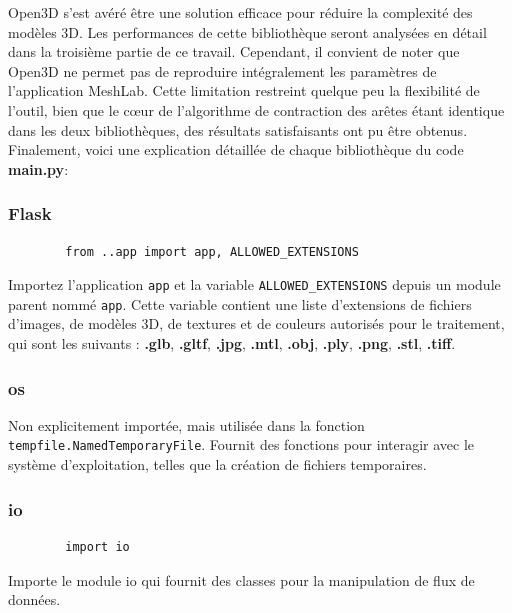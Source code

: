         Open3D s'est avéré être une solution efficace pour réduire la complexité des modèles 3D. Les performances de cette bibliothèque seront analysées en détail dans la troisième partie de ce travail. Cependant, il convient de noter que Open3D ne permet pas de reproduire intégralement les paramètres de l'application MeshLab. Cette limitation restreint quelque peu la flexibilité de l'outil, bien que le cœur de l'algorithme de contraction des arêtes étant identique dans les deux bibliothèques, des résultats satisfaisants ont pu être obtenus. Finalement, voici une explication détaillée de chaque bibliothèque du code \textbf{main.py}:

        \subsubsection{Flask}

        \begin{lstlisting}
        from ..app import app, ALLOWED_EXTENSIONS
        \end{lstlisting}
        
        Importez l'application \FSK \texttt{app} et la variable \texttt{ALLOWED\_EXTENSIONS} depuis un module parent nommé \texttt{app}. Cette variable contient une liste d'extensions de fichiers d'images, de modèles 3D, de textures et de couleurs autorisés pour le traitement, qui sont les suivants : \textbf{.glb}, \textbf{.gltf}, \textbf{.jpg}, \textbf{.mtl}, \textbf{.obj}, \textbf{.ply}, \textbf{.png}, \textbf{.stl}, \textbf{.tiff}.

        \subsubsection{os}
        Non explicitement importée, mais utilisée dans la fonction \texttt{tempfile.\linebreak NamedTemporaryFile}. Fournit des fonctions pour interagir avec le système d'exploitation, telles que la création de fichiers temporaires.


        \subsubsection{io}
        
        \begin{lstlisting}
        import io
        \end{lstlisting}
        
        Importe le module io qui fournit des classes pour la manipulation de flux de données.

